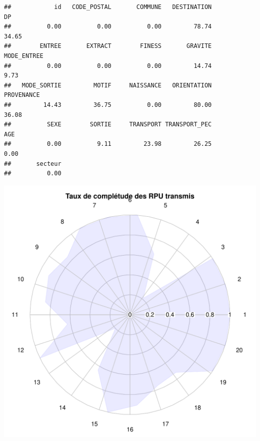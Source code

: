 \documentclass[12pt,english,french,twoside]{report}\usepackage[]{graphicx}\usepackage[]{color}
\makeatletter
\def\maxwidth{ %
  \ifdim\Gin@nat@width>\linewidth
    \linewidth
  \else
    \Gin@nat@width
  \fi
}
\newenvironment{kframe}{%
 \def\at@end@of@kframe{}%
 \ifinner\ifhmode%
  \def\at@end@of@kframe{\end{minipage}}%
  \begin{minipage}{\columnwidth}%
 \fi\fi%
 \def\FrameCommand##1{\hskip\@totalleftmargin \hskip-\fboxsep
 \colorbox{shadecolor}{##1}\hskip-\fboxsep
     \hskip-\linewidth \hskip-\@totalleftmargin \hskip\columnwidth}%
 \MakeFramed {\advance\hsize-\width
   \@totalleftmargin\z@ \linewidth\hsize
   \@setminipage}}%
 {\par\unskip\endMakeFramed%
 \at@end@of@kframe}
\newenvironment{knitrout}{}{} %
\makeatother
\begin{document}
\begin{knitrout}
\color{fgcolor}\begin{kframe}
\begin{verbatim}
##            id   CODE_POSTAL       COMMUNE   DESTINATION            DP 
##          0.00          0.00          0.00         78.74         34.65 
##        ENTREE       EXTRACT        FINESS       GRAVITE   MODE_ENTREE 
##          0.00          0.00          0.00         14.74          9.73 
##   MODE_SORTIE         MOTIF     NAISSANCE   ORIENTATION    PROVENANCE 
##         14.43         36.75          0.00         80.00         36.08 
##          SEXE        SORTIE     TRANSPORT TRANSPORT_PEC           AGE 
##          0.00          9.11         23.98         26.25          0.00 
##       secteur 
##          0.00
\end{verbatim}


{\ttfamily\noindent\color{warningcolor}{\#\# Warning: 'x' is NULL so the result will be NULL\\\#\# Warning: 'x' is NULL so the result will be NULL}}\end{kframe}
\includegraphics[width=\maxwidth]{figure/radar} 

\end{knitrout}
\end{document}
